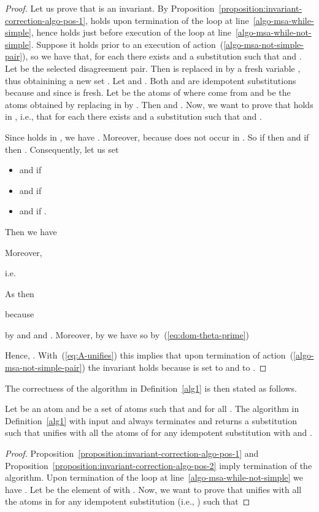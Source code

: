 \documentclass[fleqn]{tlp}
\begin{document}
\begin{appendix}
\begin{proof}
  Let us prove that  is an invariant.
  By Proposition~\ref{proposition:invariant-correction-algo-pos-1},
   holds upon termination of the loop at
  line~\ref{algo-msa-while-simple}, hence  holds
  just before execution of the loop at
  line~\ref{algo-msa-while-not-simple}.
  Suppose it holds prior to an execution of
  action~(\ref{algo-msa-not-simple-pair}), so we have that, 
  for each  there exists 
     and a substitution  such that
     and
    .
Let  be the selected disagreement pair.
  Then  is replaced in  by a fresh variable
  , thus obtainining a new set .
  Let  and . Both  and 
  are idempotent substitutions because  and  since  is fresh.
  Let  be the atoms of  where  come from
  and  be the atoms obtained by replacing
   in  by . Then  and
  . 
Now, we want to prove that  holds in , i.e., that for each
   there exists  and a substitution
   such that  and
  .
  
  Since  holds in , we have .
  Moreover,  because  does not occur in .
  So if  then  and
  if  then .
  Consequently, let us set
  \begin{itemize}
  \item  and  if 
  \item  and  if 
  \item  and  if .
  \end{itemize}
  Then we have
  
  Moreover,
  
  i.e.
  
  As  then
  
  because 
  
  by  and 
   and
  .
  Moreover, by  we have
   so by~(\ref{eq:dom-theta-prime})
  
  Hence, .
With~(\ref{eq:A-unifies}) this implies that upon termination of
  action~(\ref{algo-msa-not-simple-pair}) the invariant
   holds
  because  is set to  and  to .
\end{proof}
The correctness of the algorithm in Definition~\ref{alg1} is then
stated as follows.

\begin{theorem}\label{theorem:correction-algo-pos}
  Let  be an atom and  be a set of atoms such that
   and  for all
  . 
  The algorithm in Definition~\ref{alg1} with input  and 
  always terminates and returns a substitution  such that
   unifies with all the atoms of  for any
  idempotent substitution  with
   and
  .
\end{theorem}

\begin{proof} 
  Proposition~\ref{proposition:invariant-correction-algo-pos-1}
  and Proposition~\ref{proposition:invariant-correction-algo-pos-2}
  imply termination of the algorithm.
Upon termination of the loop at line~\ref{algo-msa-while-not-simple}
  we have .
Let  be the element of  with . 
Now, we want to prove that  unifies with all the
  atoms in  for any idempotent substitution  (i.e.,
  ) such that
  

\end{proof}
\end{appendix}
\end{document}
